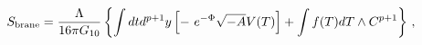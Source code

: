 \begin{equation}\label{brane_worldvolume_action}
S_{{\rm{brane}}} = {\frac{\Lambda}{16\pi G_{10}}} \left\{
 \int dt d^{p+1}y \left[ - \ e^{-\Phi} \sqrt{-A}V(T)\right]
+  \int f(T)dT\wedge C^{p+1} \right\} \, ,
\end{equation}

